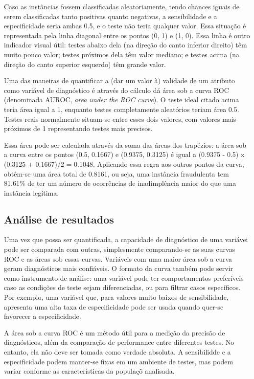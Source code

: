 Caso as instâncias fossem classificadas aleatoriamente, tendo chances iguais de serem classificadas tanto positivas quanto negativas, a sensibilidade e a especificidade seria ambas 0.5, e o teste não teria qualquer valor. Essa situação é representada pela linha diagonal entre os pontos (0, 1) e (1, 0). Essa linha é outro indicador visual útil: testes abaixo dela (na direção do canto inferior direito) têm muito pouco valor; testes próximos dela têm valor mediano; e testes acima (na direção do canto superior esquerdo) têm grande valor.

Uma das maneiras de quantificar a (dar um valor à) validade de um atributo como variável de diagnóstico é através do cálculo dá área sob a curva ROC (denominada AUROC, \emph{area under the ROC curve}). O teste ideal citado acima teria área igual a 1, enquanto testes completamente aleatórios teriam área 0.5. Testes reais normalmente situam-se entre esses dois valores, com valores mais próximos de 1 representando testes mais precisos.

Essa área pode ser calculada através da soma das áreas dos trapézios: a área sob a curva entre os pontos (0.5, 0.1667) e (0.9375, 0.3125) é igual a (0.9375 - 0.5) x (0.3125 + 0.1667)/2 = 0.1048. Aplicando essa regra aos outros pontos da curva, obtêm-se uma área total de 0.8161, ou seja, uma instância fraudulenta tem 81.61\% de ter um número de ocorrências de inadimplência maior do que uma instância legítima.

\subsection{Análise de resultados}

Uma vez que possa ser quantificada, a capacidade de diagnóstico de uma variávei pode ser comparada com outras, simplesmente comparando-se as suas curvas ROC e as áreas sob essas curvas. Variáveis com uma maior área sob a curva geram diagnósticos mais confiáveis. O formato da curva também pode servir como instrumento de análise: uma variável pode ter comportamentos preferíveis caso as condições de teste sejam diferenciadas, ou para filtrar casos específicos. Por exemplo, uma variável que, para valores muito baixos de sensibilidade, apresenta uma alta taxa de especificidade pode ser usada quando quer-se favorecer a especificidade.

A área sob a curva ROC é um método útil para a medição da precisão de diagnósticos, além da comparação de performance entre diferentes testes. No entanto, ela não deve ser tomada como verdade absoluta. A sensibilidde e a especificidade podem manter-se fixas em um ambiente de testes, mas podem variar conforme as características da populaçõ analisada.

